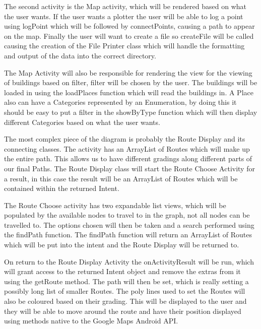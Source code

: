 The second activity is the Map activity, which will be rendered based on what the user wants. If the user wants a plotter the user will be able to log a point using logPoint which will be followed by connectPoints, causing a path to appear on the map. Finally the user will want to create a file so createFile will be called causing the creation of the File Printer class which will handle the formatting and output of the data into the correct directory. 

The Map Activity will also be responsible for rendering the view for the viewing of buildings based on filter, filter will be chosen by the user. The buildings will be loaded in using the loadPlaces function which will read the buildings in. A Place also can have a Categories represented by an Enumeration, by doing this it should be easy to put a filter in the showByType function which will then display different Categories based on what the user wants. 

The most complex piece of the diagram is probably the Route Display and its connecting classes. The activity has an ArrayList of Routes which will make up the entire path. This allows us to have different gradings along different parts of our final Paths. The Route Display class will start the Route Choose Activity for a result, in this case the result will be an ArrayList of Routes which will be contained within the returned Intent. 

The Route Choose activity has two expandable list views, which will be populated by the available nodes to travel to in the graph, not all nodes can be travelled to. The options chosen will then be taken and a search performed using the findPath function. The findPath function will return an ArrayList of Routes which will be put into the intent and the Route Display will be returned to.

On return to the Route Display Activity the onActivityResult will be run, which will grant access to the returned Intent object and remove the extras from it using the getRoute method. The path will then be set, which is really setting a possibly long list of smaller Routes. The poly lines used to set the Routes will also be coloured based on their grading. This will be displayed to the user and they will be able to move around the route and have their position displayed using methods native to the Google Maps Android API\cite{maps}. 


